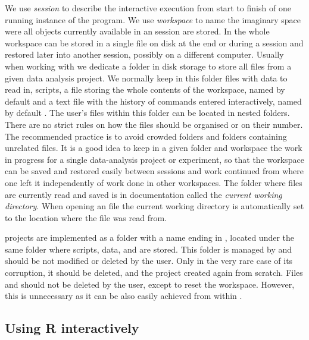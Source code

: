 \documentclass[krantz2]{krantz}\usepackage{knitr}
\begin{document}
We use \emph{session} to describe the interactive execution from start to finish of one running instance of the \Rpgrm program. We use \emph{workspace} to name the imaginary space were all objects currently available in an \Rpgrm session are stored. In \Rpgrm the whole workspace can be stored in a single file on disk at the end or during a session and restored later into another session, possibly on a different computer. Usually when working with \Rpgrm we dedicate a folder in disk storage to store all files from a given data analysis project. We normally keep in this folder files with data to read in, scripts, a file storing the whole contents of the workspace, named by default  and a text file with the history of commands entered interactively, named by default . The user's files within this folder can be located in nested folders. There are no strict rules on how the files should be organised or on their number. The recommended practice is to avoid crowded folders and folders containing unrelated files. It is a good idea to keep in a given folder and workspace the work in progress for a single data-analysis project or experiment, so that the workspace can be saved and restored easily between sessions and work continued from where one left it independently of work done in other workspaces. The folder where files are currently read and saved is in \Rpgrm documentation called the \emph{current working directory}. When opening an  file the current working directory is automatically set to the location where the  file was read from.

\begin{warningbox}
\RStudio projects are implemented as a folder with a name ending in , located under the same folder where scripts, data,  and  are stored. This folder is managed by \RStudio and should be not modified or deleted by the user. Only in the very rare case of its corruption, it should be deleted, and the \RStudio project created again from scratch. Files  and  should not be deleted by the user, except to reset the \Rlang workspace. However, this is unnecessary as it can be also easily achieved from within \Rpgrm.
\end{warningbox}

\subsection{Using R interactively}
\end{document}
